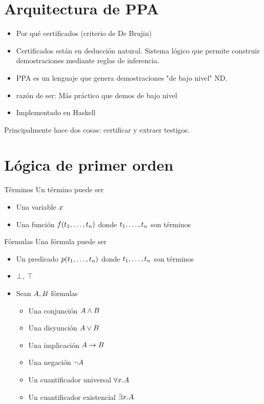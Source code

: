\section{Arquitectura de PPA}

\begin{itemize}
    \item Por qué certificados (criterio de De Brujin)
    \item Certificados están en deducción natural. Sistema lógico que permite
    construir demostraciones mediante reglas de inferencia.
    \item PPA es un lenguaje que genera demostraciones "de bajo nivel" ND.
    \item razón de ser: Más práctico que demos de bajo nivel
    \item Implementado en Haskell
\end{itemize}

Principalmente hace dos cosas: certificar y extraer testigos.

\section{Lógica de primer orden}

\begin{definition}{Términos}
    Un término puede ser
    \begin{itemize}
        \item Una variable $x$
        \item Una función $f(t_1, \dots, t_n)$ donde $t_1, \dots,
        t_n$ son términos
    \end{itemize}
\end{definition}

\begin{definition}{Fórmulas}
    Una fórmula puede ser
    \begin{itemize}
        \item Un predicado $p(t_1, \dots, t_n)$ donde $t_1, \dots,
        t_n$ son términos
        \item $\bot$, $\top$
        \item Sean $A, B$ fórmulas
        \begin{itemize}
            \item Una conjunción $A \wedge B$
            \item Una disyunción $A \vee B$
            \item Una implicación $A \to B$
            \item Una negación $\neg A$
            \item Un cuantificador universal $\forall x . A$
            \item Un cuantificador existencial $\exists x . A$
        \end{itemize}
    \end{itemize}
\end{definition}

